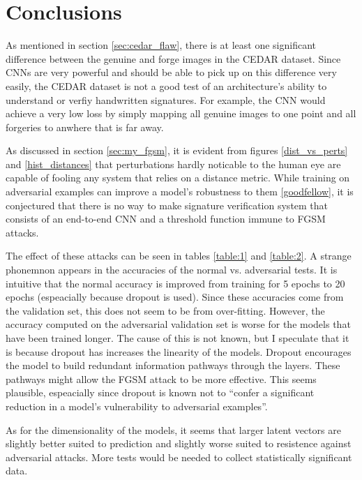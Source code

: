 \section{Conclusions}\label{sec:conclusion}

As mentioned in section \ref{sec:cedar_flaw}, there is at least one significant difference between the genuine and forge images in the CEDAR dataset.
Since CNNs are very powerful and should be able to pick up on this difference very easily, the CEDAR dataset is not a good test of an architecture's ability to understand or verfiy handwritten signatures.
For example, the CNN would achieve a very low loss by simply mapping all genuine images to one point and all forgeries to anwhere that is far away.

As discussed in section \ref{sec:my_fgsm}, it is evident from figures \ref{dist_vs_perts} and \ref{hist_distances} that perturbations hardly noticable to the human eye are capable of fooling any system that relies on a distance metric.
While training on adversarial examples can improve a model's robustness to them \ref{goodfellow}, it is conjectured that there is no way to make signature verification system that consists of an end-to-end CNN and a threshold function immune to FGSM attacks.

The effect of these attacks can be seen in tables \ref{table:1} and \ref{table:2}.
A strange phonemnon appears in the accuracies of the normal vs. adversarial tests.
It is intuitive that the normal accuracy is improved from training for 5 epochs to 20 epochs (espeacially because dropout is used).
Since these accuracies come from the validation set, this does not seem to be from over-fitting.
However, the accuracy computed on the adversarial validation set is worse for the models that have been trained longer.
The cause of this is not known, but I speculate that it is because dropout has increases the linearity of the models.
Dropout encourages the model to build redundant information pathways through the layers.
These pathways might allow the FGSM attack to be more effective.
This seems plausible, espeacially since dropout is known not to ``confer a significant reduction in a model's vulnerability to adversarial examples''\cite{goodfellow}.

As for the dimensionality of the models, it seems that larger latent vectors are slightly better suited to prediction and slightly worse suited to resistence against adversarial attacks.
More tests would be needed to collect statistically significant data.

